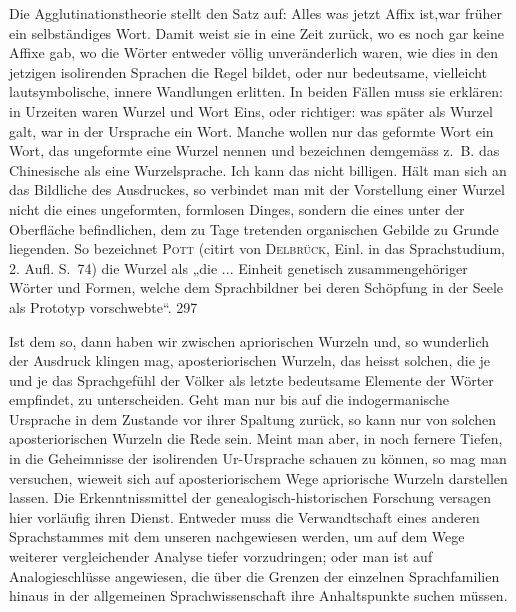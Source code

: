 { Die Agglutinationstheorie stellt den Satz auf: Alles was jetzt Affix ist,war früher ein selbständiges Wort. Damit weist sie in eine Zeit zurück, wo es noch gar keine Affixe gab, wo die Wörter entweder völlig unveränderlich waren, wie dies in den jetzigen isolirenden Sprachen die Regel bildet, oder nur bedeutsame, vielleicht lautsymbolische, innere Wandlungen erlitten. In beiden Fällen muss sie erklären: in Urzeiten waren Wurzel und Wort Eins, oder richtiger: was später als Wurzel galt, war in der Ursprache ein Wort. Manche wollen nur das geformte Wort ein Wort, das ungeformte eine Wurzel nennen und bezeichnen demgemäss z.~B. das Chinesische als eine Wurzelsprache. Ich kann das nicht billigen. Hält man sich an das Bildliche des Ausdruckes, so verbindet man mit der Vorstellung einer Wurzel nicht die eines ungeformten, formlosen Dinges, sondern die eines unter der Oberfläche befindlichen, dem zu Tage tretenden organischen Gebilde zu Grunde liegenden. So bezeichnet \textsc{Pott} (citirt von \textsc{Delbrück}, Einl. in das Sprachstudium, 2. Aufl. S.~74) die Wurzel als „die ... Einheit genetisch zusammengehöriger Wörter und Formen, welche dem Sprachbildner bei deren Schöpfung in der Seele als Prototyp vorschwebte“.  {\textbar}{\textbar}297{\textbar}{\textbar}\label{sp.297} 

\label{fp.291}

 Ist dem so, dann haben wir zwischen  apriorischen Wurzeln und, so wunderlich der Ausdruck klingen mag, aposteriorischen Wurzeln, das heisst solchen, die je und je das Sprachgefühl der Völker als letzte bedeutsame Elemente der Wörter empfindet, zu unterscheiden. Geht man nur bis auf die indogermanische Ursprache in dem Zustande vor ihrer Spaltung zurück, so kann nur von solchen aposteriorischen Wurzeln die Rede sein. Meint man aber, in noch fernere Tiefen, in die Geheimnisse der isolirenden Ur-Ursprache schauen zu können, so mag man versuchen, wieweit sich auf aposteriorischem Wege apriorische Wurzeln darstellen lassen. Die Erkenntnissmittel der genealogisch-historischen Forschung versagen hier vorläufig ihren Dienst. Entweder muss die Verwandtschaft eines anderen Sprachstammes mit dem unseren nachgewiesen werden, um auf dem Wege weiterer vergleichender Analyse tiefer vorzudringen; oder man ist auf Analogieschlüsse angewiesen, die über die Grenzen der einzelnen Sprachfamilien hinaus in der allgemeinen Sprachwissenschaft ihre Anhaltspunkte suchen müssen.

}

